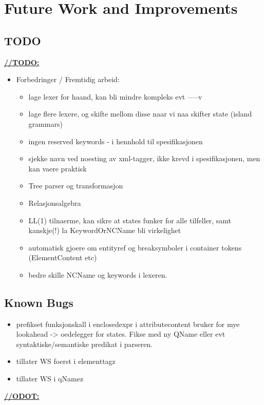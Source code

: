 \chapter{Future Work and Improvements}
\label{sect:summary:future_work}




\section{TODO}
\underline{\textbf{\LARGE //TODO:}}
\begin{itemize}
	\item Forbedringer / Fremtidig arbeid:
	\begin{itemize}
		\item lage lexer for haand, kan bli mindre kompleks evt -----v
		\item lage flere lexere, og skifte mellom disse naar vi naa skifter state (island grammars)
		\item ingen reserved keywords - i hennhold til spesifikasjonen
		\item sjekke navn ved noesting av xml-tagger, ikke krevd i spesifikasjonen, men kan vaere praktisk
		\item Tree parser og transformasjon
		\item Relasjonsalgebra
		\item LL(1) tilnaerme, kan sikre at states funker for alle tilfeller, samt kanskje(!) la KeywordOrNCName bli virkelighet
		\item automatisk gjoere om entityref og breaksymboler i container tokens (ElementContent etc)
		\item bedre skille NCName og keywords i lexeren.
	\end{itemize}	
\end{itemize}

\section{Known Bugs}
\label{sect:future:knownBugs}
\begin{itemize}
		\item prefikset funksjonskall i enclosedexpr i attributecontent bruker for mye lookahead -> oedelegger for states. Fikse med ny QName eller evt syntaktiske/semantiske predikat i parseren.
		\item tillater WS foerst i elementtagz
		\item tillater WS i qNamez
	\end{itemize}

\underline{\textbf{\LARGE //ODOT:}}
